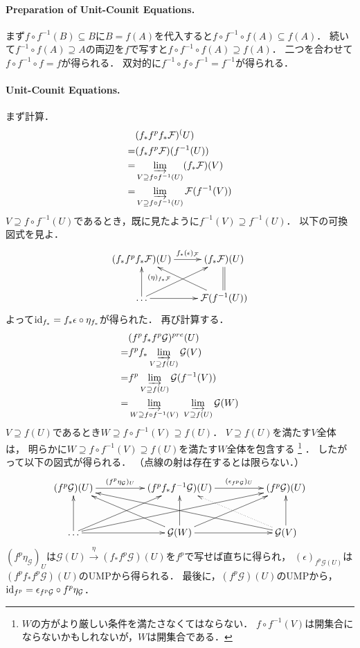\documentclass[a4paper]{jsarticle}
\newcommand{\shF}{\mathcal{F}}
\newcommand{\shG}{\mathcal{G}}
\begin{document}
    \paragraph{Preparation of Unit-Counit Equations.}
    まず$f \circ f^{-1}(B) \subseteq B$に$B=f(A)$を代入すると$f \circ f^{-1} \circ f(A) \subseteq f(A)$．
    続いて$f^{-1} \circ f(A) \supseteq A$の両辺を$f$で写すと$f \circ f^{-1} \circ f(A) \supseteq f(A)$．
    二つを合わせて$f \circ f^{-1} \circ f=f$が得られる．
    双対的に$f^{-1} \circ f \circ f^{-1}=f^{-1}$が得られる．

    \paragraph{Unit-Counit Equations.}
    まず計算．
    \begin{align*}
        {}& (f_* f^p f_* \shF)^(U) \\
        =&  (f_* f^p \shF)(f^{-1}(U)) \\
        =&  \varinjlim_{V \supseteq f \circ f^{-1}(U)} (f_* \shF) (V) \\
        =&  \varinjlim_{V \supseteq f \circ f^{-1}(U)} \shF (f^{-1}(V))
    \end{align*}
    $V \supseteq f \circ f^{-1}(U)$であるとき，既に見たように$f^{-1}(V) \supseteq f^{-1}(U)$．
    以下の可換図式を見よ．
    \[
    \xymatrix
    {
    (f_* f^p f_* \shF)(U) \ar[r]^-{f_* (\epsilon)_{\shF}} & (f_* \shF)(U) \\
    \dots \ar[u] \ar[ur] \ar[r]
    & \shF(f^{-1}(U)) \ar[ul]^(0.7){(\eta)_{f_* \shF}} \ar@{=}[u]
    }
    \]
    よって$\mathrm{id}_{f_*}=f_* \epsilon \circ \eta_{f_*}$が得られた．
    再び計算する．
    \begin{align*}
        {}& (f^p f_* f^p \shG)^{pre}(U) \\
        =&  f^p f_* \varinjlim_{V \supseteq f(U)} \shG (V) \\
        =&  f^p \varinjlim_{V \supseteq f(U)} \shG (f^{-1}(V)) \\
        =&  \varinjlim_{W \supseteq f \circ f^{-1}(V)} ~ \varinjlim_{V \supseteq f(U)} \shG(W)
    \end{align*}
    $V \supseteq f(U)$であるとき$W \supseteq f \circ f^{-1}(V) \supseteq f(U)$．
    $V \supseteq f(U)$を満たす$V$全体は，
    明らかに$W \supseteq f \circ f^{-1}(V) \supseteq f(U)$を満たす$W$全体を包含する
    \footnote
    {
        $W$の方がより厳しい条件を満たさなくてはならない．
        $f \circ f^{-1}(V)$は開集合にならないかもしれないが，$W$は開集合である．
    }
    ．
    したがって以下の図式が得られる．
    （点線の射は存在するとは限らない．）
    \[
    \xymatrix@C=5em@R=3em
    {
    (f^p \shG)(U) \ar[r]^-{(f^p\eta_{\shG})_U}
    & (f^p f_* f^{-1} \shG)(U) \ar[r]^-{(\epsilon_{f^p\shG})_U}
    & (f^p \shG)(U) \\
    \dots \ar[u] \ar[ur] \ar[r] \ar[urr]
    & \shG(W) \ar[ul] \ar[u] \ar[r] \ar[ur]
    & \shG(V) \ar[ull] \ar[u] \ar@{..>}[ul]
    }
    \]
    $(f^p \eta_{\shG})_U$は$\shG(U) \xrightarrow{\eta} (f_* f^p \shG)(U)$を$f^p$で写せば直ちに得られ，
    $(\epsilon)_{f^p\shG(U)}$は$(f^p f_* f^p \shG)(U)$のUMPから得られる．
    最後に，$(f^p \shG)(U)$のUMPから，
    $\id{f^p}=\epsilon_{f^p\shG} \circ f^p \eta_{\shG}$．
\end{document}
